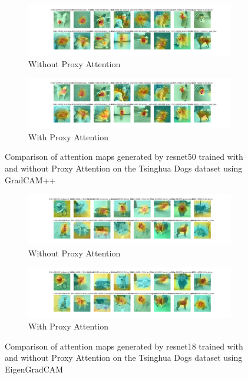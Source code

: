 \documentclass[a4paper,11pt,openright]{book}
\begin{document}
\begin{figure}[!htb]
    \centering
    \begin{subfigure}[b]{1\textwidth}
        \includegraphics[width=\textwidth]{images/gpp_tsing_resnet50_noproxy_3.pdf}
        \caption{Without Proxy Attention}
    \end{subfigure}
    \hfill
    \begin{subfigure}[b]{1\textwidth}
        \includegraphics[width=\textwidth]{images/gpp_tsing_resnet50_proxy_3.pdf}
        \caption{With Proxy Attention}
    \end{subfigure}
    \caption{Comparison of attention maps generated by resnet50 trained with and without Proxy Attention on the Tsinghua Dogs dataset using GradCAM++}
\end{figure}


\begin{figure}[!htb]
    \centering
    \begin{subfigure}[b]{1\textwidth}
        \includegraphics[width=\textwidth]{images/tsing_resnet18_noproxy_1.pdf}
        \caption{Without Proxy Attention}
    \end{subfigure}
    \hfill
    \begin{subfigure}[b]{1\textwidth}
        \includegraphics[width=\textwidth]{images/tsing_resnet18_proxy_1.pdf}
        \caption{With Proxy Attention}
    \end{subfigure}
    \caption{Comparison of attention maps generated by resnet18 trained with and without Proxy Attention on the Tsinghua Dogs dataset using EigenGradCAM}
\end{figure}
\end{document}
